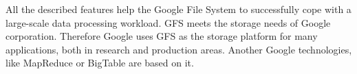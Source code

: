 All the described features help the Google File System to successfully cope with a large-scale data processing workload.
GFS meets the storage needs of Google corporation.
Therefore Google uses GFS as the storage platform for many applications, both in research and production areas.
Another Google technologies, like MapReduce or BigTable are based on it.  	 


	
